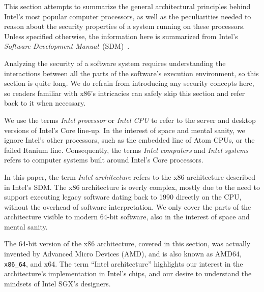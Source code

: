 \label{sec:architecture_background}

This section attempts to summarize the general architectural principles behind
Intel's most popular computer processors, as well as the peculiarities needed
to reason about the security properties of a system running on these
processors. Unless specified otherwise, the information here is summarized from
Intel's \textit{Software Development Manual}~(SDM)~\cite{intel2015sdm}.

Analyzing the security of a software system requires understanding the
interactions between all the parts of the software's execution environment, so
this section is quite long. We do refrain from introducing any security
concepts here, so readers familiar with x86's intricacies can safely skip this
section and refer back to it when necessary.

We use the terms \textit{Intel processor} or \textit{Intel CPU} to refer to the
server and desktop versions of Intel's Core line-up. In the interest of space
and mental sanity, we ignore Intel's other processors, such as the embedded
line of Atom CPUs, or the failed Itanium line. Consequently, the terms
\textit{Intel computers} and \textit{Intel systems} refers to computer systems
built around Intel's Core processors.

In this paper, the term \textit{Intel architecture} refers to the x86
architecture described in Intel's SDM. The x86 architecture is overly complex,
mostly due to the need to support executing legacy software dating back to 1990
directly on the CPU, without the overhead of software interpretation. We only
cover the parts of the architecture visible to modern 64-bit software, also
in the interest of space and mental sanity.

The 64-bit version of the x86 architecture, covered in this section, was actually
invented by Advanced Micro Devices (AMD), and is also known as AMD64,
\texttt{x86\_64}, and x64. The term ``Intel architecture'' highlights our
interest in the architecture's implementation in Intel's chips, and our desire
to understand the mindsets of Intel SGX's designers.
















